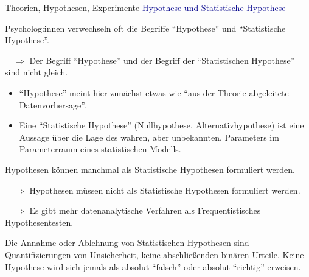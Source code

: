 \documentclass[
  8pt,
  ignorenonframetext,
]{beamer}
\providecommand{\tightlist}{%
  \setlength{\itemsep}{0pt}\setlength{\parskip}{0pt}}
\begin{document}
\begin{frame}{Theorien, Hypothesen, Experimente}
\protect\hypertarget{theorien-hypothesen-experimente-3}{}
\textcolor{darkblue}{Hypothese und Statistische Hypothese}

\small

Psycholog:innen verwechseln oft die Begriffe ``Hypothese'' und
``Statistische Hypothese''.

\(\quad\Rightarrow\) Der Begriff ``Hypothese'' und der Begriff der
``Statistischen Hypothese'' sind nicht gleich.

\begin{itemize}
\tightlist
\item
  \justifying ``Hypothese'' meint hier zunächst etwas wie ``aus der
  Theorie abgeleitete Datenvorhersage''.
\item
  Eine ``Statistische Hypothese'' (Nullhypothese, Alternativhypothese)
  ist eine Aussage über die Lage des wahren, aber unbekannten,
  Parameters im Parameterraum eines statistischen Modells.
\end{itemize}

Hypothesen können manchmal als Statistische Hypothesen formuliert
werden.

\(\quad\Rightarrow\) Hypothesen müssen nicht als Statistische Hypothesen
formuliert werden.

\(\quad\Rightarrow\) Es gibt mehr datenanalytische Verfahren als
Frequentistisches Hypothesentesten.

Die Annahme oder Ablehnung von Statistischen Hypothesen sind
Quantifizierungen von Unsicherheit, keine abschließenden binären
Urteile. Keine Hypothese wird sich jemals als absolut ``falsch'' oder
absolut ``richtig'' erweisen.
\end{frame}
\end{document}
